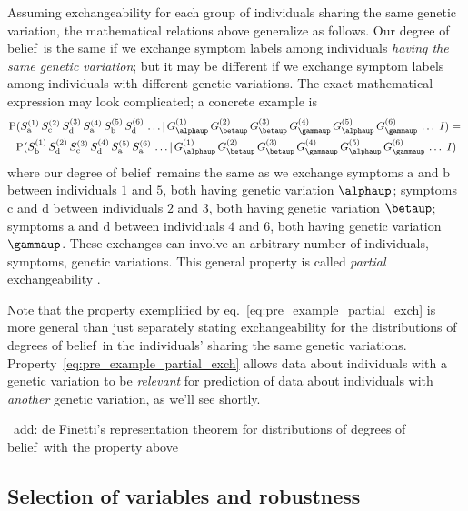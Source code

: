 \documentclass[\ifafour a4paper,12pt,\else a5paper,10pt,\fi%
onecolumn,oneside,article,%
british%
]{memoir}
\theoremstyle{remark}
\theoremstyle{innote}
\renewcommand*{\cites}{\parencites}
\newcommand*{\p}{\mathrm{P}}%
\renewcommand*{\|}{\mathpunct{|}}
\newcommand*{\eqn}{eq.}%
\newcommand*{\puzzle}{\maltese}
\newcommand{\mynote}[1]{ {\color{notecolour}\puzzle\ #1}}
\newcommand*{\dob}{degree of belief}
\newcommand*{\dobs}{degrees of belief}
\newcommand*{\yI}{I}
\newcommand*{\yGi}[1]{G^{(#1)}}
\newcommand*{\ySi}[1]{S^{(#1)}}
\begin{document}
Assuming exchangeability for each group of individuals sharing the same
genetic variation, the mathematical relations above generalize as follows.
Our \dob\ is the same if we exchange symptom labels among individuals
\emph{having the same genetic variation}; but it may be different if we
exchange symptom labels among individuals with different genetic
variations. The exact mathematical expression may look complicated; a
concrete example is
\begin{multline}
  \label{eq:pre_example_partial_exch}
  \p(\ySi{1}_{\text{a}}\, \ySi{2}_{\text{c}}\, \ySi{3}_{\text{d}}\,
  \ySi{4}_{\text{a}}\, \ySi{5}_{\text{b}}\, \ySi{6}_{\text{d}}\,\dotso \|
  \yGi{1}_{\alphaup}\, \yGi{2}_{\betaup}\, \yGi{3}_{\betaup}\,
  \yGi{4}_{\gammaup}\, \yGi{5}_{\alphaup}\, \yGi{6}_{\gammaup}\,\dotso
  \;\yI)
  ={}\\
  \p(\ySi{1}_{\text{b}}\, \ySi{2}_{\text{d}}\, \ySi{3}_{\text{c}}\,
  \ySi{4}_{\text{d}}\, \ySi{5}_{\text{a}}\, \ySi{6}_{\text{a}}\,\dotso \|
  \yGi{1}_{\alphaup}\, \yGi{2}_{\betaup}\, \yGi{3}_{\betaup}\,
  \yGi{4}_{\gammaup}\, \yGi{5}_{\alphaup}\, \yGi{6}_{\gammaup}\,\dotso
  \;\yI)
\end{multline}
where our \dob\ remains the same as we exchange symptoms $\text{a}$
and $\text{b}$ between individuals $1$ and $5$, both having genetic
variation $\alphaup$; symptoms $\text{c}$ and $\text{d}$ between
individuals $2$ and $3$, both having genetic variation $\betaup$; symptoms
$\text{a}$ and $\text{d}$ between individuals $4$ and $6$, both having
genetic variation $\gammaup$. These exchanges can involve an arbitrary
number of individuals, symptoms, genetic variations. This general property
is called \emph{partial} exchangeability
\cites{definetti1938,diaconisetal1980b,diaconis1988}[for a connection with
sampling theory see][]{sugden1982,sugden1993}.

Note that the property exemplified by \eqn~\eqref{eq:pre_example_partial_exch}
is more general than just separately stating exchangeability for the
distributions of \dobs\ in the individuals' sharing the same genetic
variations. Property~\eqref{eq:pre_example_partial_exch} allows data about
individuals with a genetic variation to be \emph{relevant} for prediction
of data about individuals with \emph{another} genetic variation, as we'll
see shortly.


\mynote{add: de Finetti's representation theorem for distributions of
  \dobs\ with the property above}

\subsection{Selection of variables and robustness}
\label{sec:pre_variable_selection_robustness}
\end{document}
